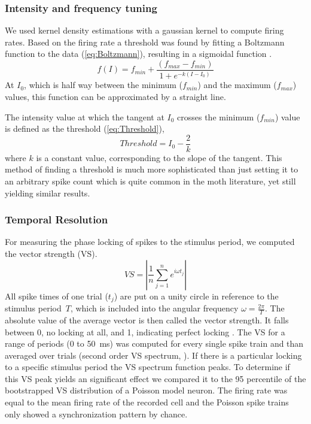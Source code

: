 \documentclass[12pt,a4paper]{article}
\begin{document}
\subsubsection{Intensity and frequency tuning}
We used kernel density estimations with a gaussian kernel to compute firing rates. Based on the firing rate a threshold was found by fitting a Boltzmann function to the data (\ref{eq:Boltzmann}), resulting in a sigmoidal function \cite{benda2008}.
\begin{equation}
\label{eq:Boltzmann}
f(I) = f_{min} + \frac{(f_{max}-f_{min})}{1+e^{-k(I-I_0)}}
\end{equation}
At $I_{0}$, which is half way between the minimum ($f_{min}$) and the maximum ($f_{max}$) values, this function can be approximated by a straight line.

The intensity value at which the tangent at $I_{0}$ crosses the minimum ($f_{min}$) value is defined as the threshold (\ref{eq:Threshold}),  
\begin{equation}
\label{eq:Threshold}
Threshold = I_{0} - \frac{2}{k}
\end{equation}
where $k$ is a constant value, corresponding to the slope of the tangent.
This method of finding a threshold is much more sophisticated than just setting it to an arbitrary spike count which is quite common in the moth literature, yet still yielding similar results.


\subsubsection{Temporal Resolution}
For measuring the phase locking of spikes to the stimulus period, we computed the vector strength (VS). 
\begin{equation}
\label{eq:VS}
VS = \left|\frac{1}{n} \sum_{j=1}^{n}e^{i\omega t_j}\right|
\end{equation}
All spike times of one trial ($t_{j}$) are put on a unity circle in reference to the stimulus period~$T$, which is included into the angular frequency $\omega = \frac{2\pi}{T}$. The absolute value of the average vector is then called the vector strength. It falls between 0, no locking at all, and 1, indicating perfect locking \cite{vanhemmen2013}. 
The VS for a range of periods (0 to 50~ms) was computed for every single spike train and than averaged over trials (second order VS spectrum, \cite{sinz2017a}). 
If there is a particular locking to a specific stimulus period the VS spectrum function peaks. To determine if this VS peak yields an significant effect we compared it to the 95 percentile of the bootstrapped VS distribution of a Poisson model neuron. The firing rate was equal to the mean firing rate of the recorded cell and the Poisson spike trains only showed a synchronization pattern by chance. 
\end{document}
